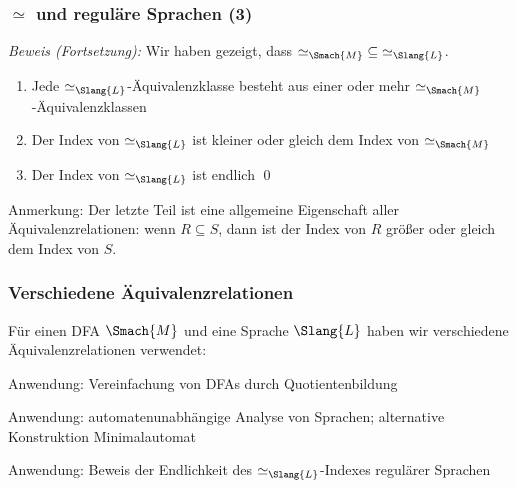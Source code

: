 \documentclass[aspectratio=1610,onlymath]{beamer}
\begin{document}
\begin{frame}[t]\frametitle{$\simeq$ und reguläre Sprachen (3)}


\emph{Beweis (Fortsetzung):} Wir haben gezeigt, dass ${\simeq_{\Smach{M}}}\subseteq {\simeq_{\Slang{L}}}$.\pause
\medskip

\begin{enumerate}[$\leadsto$]
\item Jede ${\simeq_{\Slang{L}}}$-Äquivalenzklasse besteht aus einer oder mehr ${\simeq_{\Smach{M}}}$-Äquivalenzklassen\pause
\item Der Index von ${\simeq_{\Slang{L}}}$ ist kleiner oder gleich dem Index von ${\simeq_{\Smach{M}}}$\pause
\item Der Index von ${\simeq_{\Slang{L}}}$ ist endlich \qed
\end{enumerate}
\medskip

\textcolor{devilscss}{\footnotesize Anmerkung: Der letzte Teil ist eine allgemeine Eigenschaft aller Äquivalenzrelationen: wenn $R\subseteq S$, dann ist der Index von $R$ größer oder gleich dem Index von $S$.}

\end{frame}

\begin{frame}[t]\frametitle{Verschiedene Äquivalenzrelationen}

Für einen DFA $\Smach{M}$ und eine Sprache $\Slang{L}$ haben wir verschiedene
Äquivalenzrelationen verwendet:
\medskip

%
\medskip

\alert{Anwendung:} Vereinfachung von DFAs durch Quotientenbildung
\medskip

%
\medskip

\alert{Anwendung:} automatenunabhängige Analyse von Sprachen; alternative Konstruktion Minimalautomat
\medskip

%
\medskip

\alert{Anwendung:} Beweis der Endlichkeit des $\simeq_{\Slang{L}}$-Indexes regulärer Sprachen


\end{frame}
\end{document}
